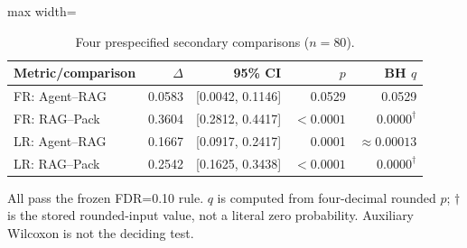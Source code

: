 \begin{table}[t]
\centering
\caption{Four prespecified secondary comparisons ($n=80$).}\label{tab:secondary}
\small
\begin{adjustbox}{max width=\textwidth}\begin{tabular}{lrrrr}
\toprule
Metric/comparison & $\Delta$ & 95\% CI & $p$ & BH $q$ \\
\midrule
FR: Agent--RAG & 0.0583 & [0.0042, 0.1146] & 0.0529 & 0.0529 \\
FR: RAG--Pack & 0.3604 & [0.2812, 0.4417] & $<0.0001$ & $0.0000^{\dagger}$ \\
LR: Agent--RAG & 0.1667 & [0.0917, 0.2417] & 0.0001 & $\approx0.00013$ \\
LR: RAG--Pack & 0.2542 & [0.1625, 0.3438] & $<0.0001$ & $0.0000^{\dagger}$ \\
\bottomrule
\end{tabular}\end{adjustbox}
\par\vspace{2pt}\begin{minipage}{\textwidth}\footnotesize All pass the frozen FDR=0.10 rule. $q$ is computed from four-decimal rounded $p$; $\dagger$ is the stored rounded-input value, not a literal zero probability. Auxiliary Wilcoxon is not the deciding test.\end{minipage}
\end{table}
